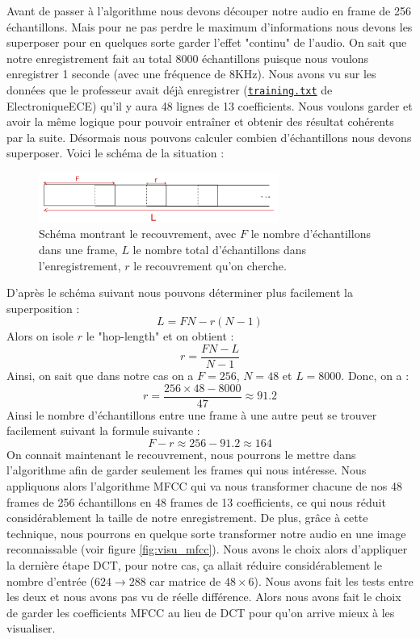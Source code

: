 \documentclass[a4paper,11pt]{article}
\begin{document}
Avant de passer à l'algorithme nous devons découper notre audio en frame de 256 échantillons. Mais pour ne pas perdre le maximum d'informations nous devons les superposer pour en quelques sorte garder l'effet "continu" de l'audio. On sait que notre enregistrement fait au total 8000 échantillons puisque nous voulons enregistrer 1 seconde (avec une fréquence de 8KHz). Nous avons vu sur les données que le professeur avait déjà enregistrer (\href{https://github.com/ElectroniqueECE/Projet_ING3/blob/main/training.txt}{\texttt{training.txt}} de ElectroniqueECE) qu'il y aura 48 lignes de 13 coefficients. Nous voulons garder et avoir la même logique pour pouvoir entraîner et obtenir des résultat cohérents par la suite. Désormais nous pouvons calculer combien d'échantillons nous devons superposer. Voici le schéma de la situation : 
\begin{figure} [H]
	\centering
	\includegraphics[width=0.7\textwidth]{images/recouvrement.jpg}
	\caption{Schéma montrant le recouvrement, avec $F$ le nombre d'échantillons dans une frame, $L$ le nombre total d'échantillons dans l'enregistrement, $r$ le recouvrement qu'on cherche.}
\end{figure}
D'après le schéma suivant nous pouvons déterminer plus facilement la superposition : 
\[
	L = FN - r(N-1)
\]
Alors on isole $r$ le "hop-length" et on obtient : 
\begin{equation}
	r = \frac{FN - L}{N-1}
\end{equation}\label{eq:recouvrement}
Ainsi, on sait que dans notre cas on a $F = 256$, $N = 48$ et $L = 8000$. Donc, on a :
\[
	r = \frac{256 \times 48 - 8000}{47} \approx 91.2
\] 
Ainsi le nombre d'échantillons entre une frame à une autre peut se trouver facilement suivant la formule suivante :
\[
	F - r \approx 256 - 91.2 \approx 164
\]
On connait maintenant le recouvrement, nous pourrons le mettre dans l'algorithme afin de garder seulement les frames qui nous intéresse. Nous appliquons alors l'algorithme MFCC qui va nous transformer chacune de nos 48 frames de 256 échantillons en 48 frames de 13 coefficients, ce qui nous réduit considérablement la taille de notre enregistrement. De plus, grâce à cette technique, nous pourrons en quelque sorte transformer notre audio en une image reconnaissable (voir figure \ref{fig:visu_mfcc}). Nous avons le choix alors d'appliquer la dernière étape DCT, pour notre cas, ça allait réduire considérablement le nombre d'entrée ($624 \rightarrow 288$ car matrice de $48 \times 6$). Nous avons fait les tests entre les deux et nous avons pas vu de réelle différence. Alors nous avons fait le choix de garder les coefficients MFCC au lieu de DCT pour qu'on arrive mieux à les visualiser.
\end{document}
